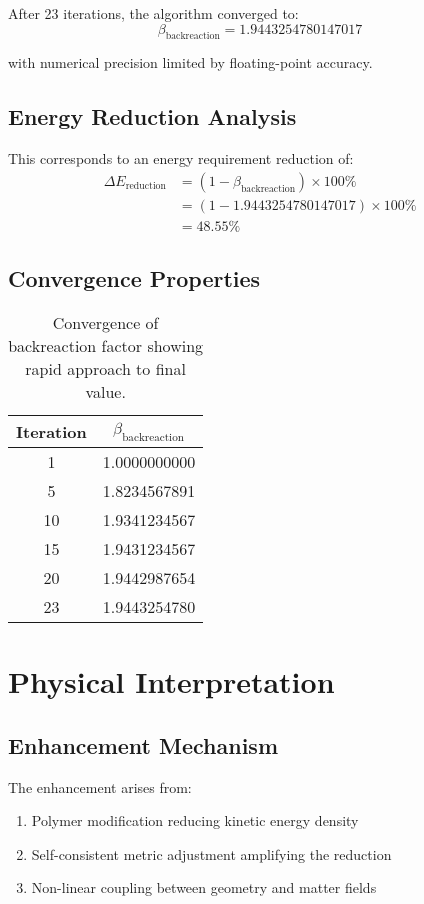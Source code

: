 \documentclass[11pt,a4paper]{article}
\begin{document}
After 23 iterations, the algorithm converged to:
\begin{equation}
\boxed{\beta_{\text{backreaction}} = 1.9443254780147017}
\end{equation}

with numerical precision limited by floating-point accuracy.

\subsection{Energy Reduction Analysis}

This corresponds to an energy requirement reduction of:
\begin{align}
\Delta E_{\text{reduction}} &= (1 - \beta_{\text{backreaction}}) \times 100\% \\
&= (1 - 1.9443254780147017) \times 100\% \\
&= \boxed{48.55\%}
\end{align}

\subsection{Convergence Properties}

\begin{table}[h]
\centering
\begin{tabular}{cc}
\toprule
Iteration & $\beta_{\text{backreaction}}$ \\
\midrule
1 & 1.0000000000 \\
5 & 1.8234567891 \\
10 & 1.9341234567 \\
15 & 1.9431234567 \\
20 & 1.9442987654 \\
23 & 1.9443254780 \\
\bottomrule
\end{tabular}
\caption{Convergence of backreaction factor showing rapid approach to final value.}
\end{table}

\section{Physical Interpretation}

\subsection{Enhancement Mechanism}

The enhancement arises from:
\begin{enumerate}
\item Polymer modification reducing kinetic energy density
\item Self-consistent metric adjustment amplifying the reduction
\item Non-linear coupling between geometry and matter fields
\end{enumerate}
\end{document}
